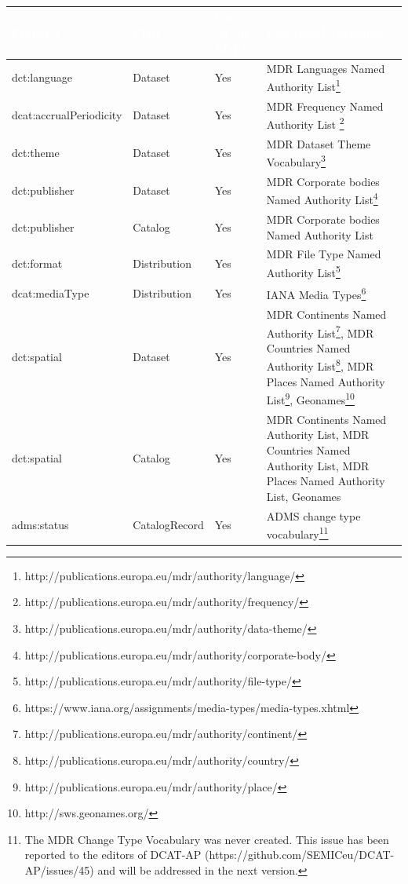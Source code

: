 \documentclass[<options>]{elsarticle}
\begin{document}
\begin{longtabu} to 
\textcolor{white}{\textbf{Property}} & \textcolor{white}{\textbf{Class}} & \textcolor{white}{\textbf{Used on the EDP?}} & \textcolor{white}{\textbf{Controlled Vocabulary}} \\ \hline
{} dct:language&Dataset &Yes &MDR Languages Named Authority List\footnote{http://publications.europa.eu/mdr/authority/language/} \\ \hline
{} dcat:accrualPeriodicity&Dataset &Yes &MDR Frequency Named Authority List \footnote{http://publications.europa.eu/mdr/authority/frequency/}\\ \hline
{} dct:theme&Dataset &Yes &MDR Dataset Theme Vocabulary\footnote{http://publications.europa.eu/mdr/authority/data-theme/} \\ \hline
{} dct:publisher&Dataset &Yes &MDR Corporate bodies Named Authority List\footnote{http://publications.europa.eu/mdr/authority/corporate-body/} \\ \hline
{} dct:publisher&Catalog &Yes &MDR Corporate bodies Named Authority List \\ \hline
{} dct:format&Distribution &Yes &MDR File Type Named Authority List\footnote{http://publications.europa.eu/mdr/authority/file-type/}\\ \hline
{} dcat:mediaType&Distribution &Yes &IANA Media Types\footnote{https://www.iana.org/assignments/media-types/media-types.xhtml} \\ \hline
{} dct:spatial&Dataset &Yes &MDR Continents Named Authority List\footnote{http://publications.europa.eu/mdr/authority/continent/}, MDR Countries Named Authority List\footnote{http://publications.europa.eu/mdr/authority/country/}, MDR Places Named Authority List\footnote{http://publications.europa.eu/mdr/authority/place/}, Geonames\footnote{http://sws.geonames.org/} \\ \hline
{} dct:spatial&Catalog &Yes &MDR Continents Named Authority List, MDR Countries Named Authority List, MDR Places Named Authority List, Geonames \\ \hline
{} adms:status&CatalogRecord &Yes &ADMS change type vocabulary\footnote{The MDR Change Type Vocabulary was never created. This issue has been reported to the editors of DCAT-AP (https://github.com/SEMICeu/DCAT-AP/issues/45) and will be addressed in the next version.} \\ \hline

\end{longtabu}
\end{document}
